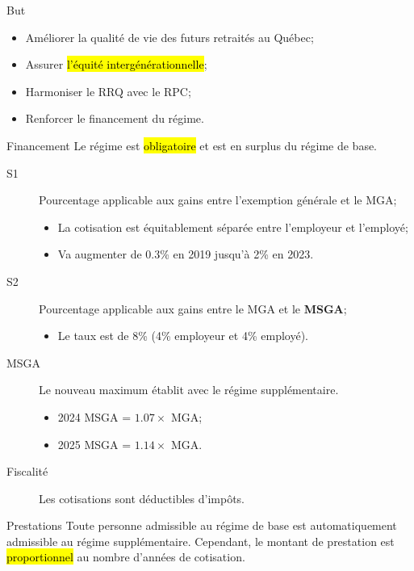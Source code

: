 \documentclass[10pt, french]{article}
\begin{document}
\begin{multicols*}{3}
\begin{conceptgen}{But}
\begin{itemize}[leftmargin = *]
	\item	Améliorer la qualité de vie des futurs retraités au Québec;
	\item	Assurer \hl{l'équité intergénérationnelle};
	\item	Harmoniser le RRQ avec le RPC;
	\item	Renforcer le financement du régime.
\end{itemize}
\end{conceptgen}

\begin{conceptgen}{Financement}
Le régime est \hl{obligatoire} et est en surplus du régime de base.

\begin{description}
	\item[S1]	Pourcentage applicable aux gains entre l'exemption générale et le MGA;
		\begin{itemize}[leftmargin = *]
		\item	La cotisation est équitablement séparée entre l'employeur et l'employé;
		\item	Va augmenter de 0.3\% en 2019 jusqu'à 2\% en 2023.
		\end{itemize}
	\item[S2]	Pourcentage applicable aux gains entre le MGA et le \textbf{MSGA};
		\begin{itemize}[leftmargin = *]
		\item	Le taux est de 8\% (4\% employeur et 4\% employé).
		\end{itemize}
	\item[MSGA]	Le nouveau maximum établit avec le régime supplémentaire.
		\begin{itemize}[leftmargin = *]
		\item	2024 MSGA = $1.07 \times$ MGA;
		\item	2025 MSGA = $1.14 \times$ MGA.
		\end{itemize}
	\item[Fiscalité]		Les cotisations sont déductibles d'impôts.
\end{description}
\end{conceptgen}

\begin{conceptgen}{Prestations}
Toute personne admissible au régime de base est automatiquement admissible au régime supplémentaire. Cependant, le montant de prestation est \hl{proportionnel} au nombre d'années de cotisation.\\


\end{conceptgen}
\end{multicols*}
\end{document}
